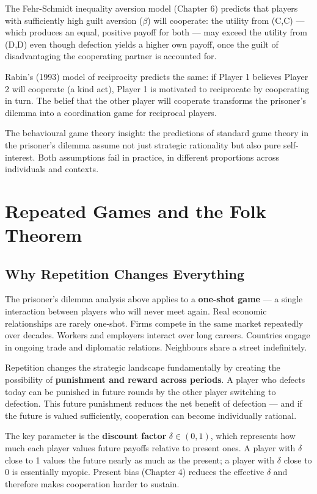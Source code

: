 \documentclass[12pt, letterpaper]{article}
\begin{document}
The Fehr-Schmidt inequality aversion model (Chapter 6) predicts that players with sufficiently high guilt aversion ($\beta$) will cooperate: the utility from (C,C) --- which produces an equal, positive payoff for both --- may exceed the utility from (D,D) even though defection yields a higher own payoff, once the guilt of disadvantaging the cooperating partner is accounted for.

Rabin's (1993) model of reciprocity predicts the same: if Player 1 believes Player 2 will cooperate (a kind act), Player 1 is motivated to reciprocate by cooperating in turn. The belief that the other player will cooperate transforms the prisoner's dilemma into a coordination game for reciprocal players.

The behavioural game theory insight: the predictions of standard game theory in the prisoner's dilemma assume not just strategic rationality but also pure self-interest. Both assumptions fail in practice, in different proportions across individuals and contexts.

\newpage



\section{Repeated Games and the Folk Theorem}



\subsection{Why Repetition Changes Everything}


The prisoner's dilemma analysis above applies to a \textbf{one-shot game} --- a single interaction between players who will never meet again. Real economic relationships are rarely one-shot. Firms compete in the same market repeatedly over decades. Workers and employers interact over long careers. Countries engage in ongoing trade and diplomatic relations. Neighbours share a street indefinitely.

Repetition changes the strategic landscape fundamentally by creating the possibility of \textbf{punishment and reward across periods}. A player who defects today can be punished in future rounds by the other player switching to defection. This future punishment reduces the net benefit of defection --- and if the future is valued sufficiently, cooperation can become individually rational.

The key parameter is the \textbf{discount factor} $\delta \in (0,1)$, which represents how much each player values future payoffs relative to present ones. A player with $\delta$ close to 1 values the future nearly as much as the present; a player with $\delta$ close to 0 is essentially myopic. Present bias (Chapter 4) reduces the effective $\delta$ and therefore makes cooperation harder to sustain.
\end{document}
